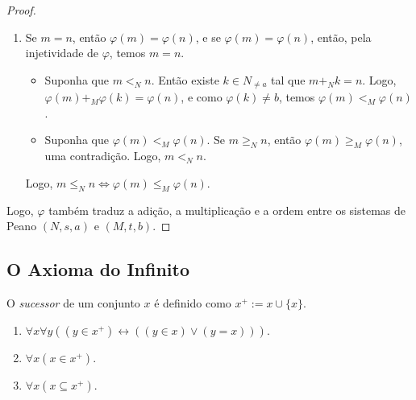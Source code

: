 \begin{proof}
\begin{enumerate}[label=\roman*.]
\begin{align*}
                    &= \varphi(m) \cdot_M \varphi(s(n)),
                \end{align*}
            isto é, $s(n) \in A$. Logo, $A = N$, isto é, $\varphi(m \cdot_N n) = \varphi(m) \cdot_M \varphi(n)$, para quaisquer $m, n \in N$.
            \item Se $m = n$, então $\varphi(m) = \varphi(n)$, e se $\varphi(m) = \varphi(n)$, então, pela injetividade de $\varphi$, temos $m=n$. 
                \begin{itemize}
                    \item[($\Rightarrow$)] Suponha que $m <_N n$. Então existe $k \in N_{\neq a}$ tal que $m +_N k = n$. Logo, $\varphi(m) +_M \varphi(k) = \varphi(n)$, e como $\varphi(k) \neq b$, temos $\varphi(m) <_M \varphi(n)$.
                    \item[($\Leftarrow$)] Suponha que $\varphi(m) <_M \varphi(n)$. Se $m \geq_N n$, então $\varphi(m) \geq_M \varphi(n)$, uma contradição. Logo, $m <_N n$. 
                \end{itemize}
            Logo, $m \leq_N n \Leftrightarrow \varphi(m) \leq_M \varphi(n)$.
        \end{enumerate}
    Logo, $\varphi$ também traduz a adição, a multiplicação e a ordem entre os sistemas de Peano $(N,s,a)$ e $(M,t,b)$. \blackproof
\end{proof}

\subsection{O Axioma do Infinito}

\begin{definition}
    O \emph{sucessor} de um conjunto $x$ é definido como $x^+ := x \cup \{x\}$.
\end{definition}

\begin{proposition}
    \leavevmode
        \begin{enumerate}[leftmargin=*, align=left, label=\textbf{(\alph*)}]
            \item $\forall x \forall y ((y \in x^+) \leftrightarrow ((y \in x) \lor (y = x)))$.
            \item $\forall x (x \in x^+)$.
            \item $\forall x (x \subseteq x^+)$.
        \end{enumerate}
\end{proposition}

